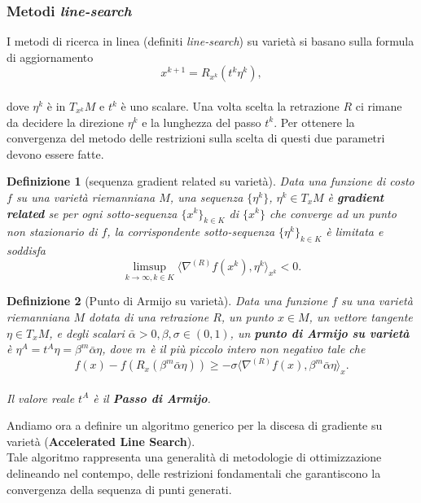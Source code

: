 \documentclass[a4paper, 12pt]{article}
\newtheorem{definition}{Definizione}
\begin{document}
\subsubsection{Metodi \emph{line-search}} \label{riemannian_linesearch}
I metodi di ricerca in linea (definiti \emph{line-search}) su varietà si basano sulla formula di aggiornamento\\
\[x^{k+1} = R_{x^k}(t^k \eta^k),\]\\
dove $\eta^k$ è in $T_{x^k}M$ e $t^k$ è uno scalare. Una volta scelta la retrazione $R$ ci rimane da decidere la direzione $\eta^k$ e la lunghezza del passo $t^k$. Per ottenere la convergenza del metodo delle restrizioni sulla scelta di questi due parametri devono essere fatte.\\
\begin{definition}[sequenza gradient related su varietà]
Data una funzione di costo $f$ su una varietà riemanniana $M$, una sequenza $\{\eta^k \}$, $\eta^k \in T_xM$ è \textbf{gradient related} se per ogni sotto-sequenza $\{x^k\}_{k \in K}$ di $\{x^k\}$ che converge ad un punto non stazionario di $f$, la corrispondente sotto-sequenza $\{\eta^k\}_{k \in K}$ è limitata e soddisfa\\
\[\limsup\limits_{k \to \infty, k \in K} \langle \nabla^{(R)} f(x^k), \eta^k \rangle_{x^k} < 0.\]
\end{definition}
\begin{definition}[Punto di Armijo su varietà]
Data una funzione $f$ su una varietà riemanniana $M$ dotata di una retrazione $R$, un punto $x \in M$, un vettore tangente $\eta \in T_xM$, e degli scalari $\bar{\alpha} > 0, \beta, \sigma \in (0, 1)$, un \textbf{punto di Armijo su varietà} è $\eta^A = t^{A}\eta = \beta^{m}\bar{\alpha}\eta$, dove $m$ è il più piccolo intero non negativo tale che\\
\[f(x) - f(R_x(\beta^{m}\bar{\alpha}\eta)) \geq -\sigma \langle \nabla^{(R)} f(x), \beta^m\bar{\alpha}\eta \rangle_x.\]\\
Il valore reale $t^A$ è il \textbf{Passo di Armijo}.
\end{definition}
Andiamo ora a definire un algoritmo generico per la discesa di gradiente su varietà (\textbf{Accelerated Line Search}).\\
Tale algoritmo rappresenta una generalità di metodologie di ottimizzazione delineando nel contempo, delle restrizioni fondamentali che garantiscono la convergenza della sequenza di punti generati.\\
\end{document}
